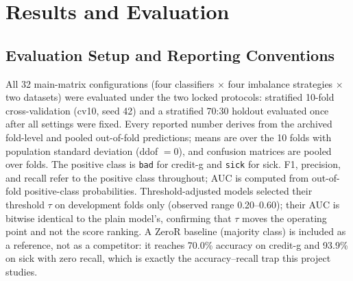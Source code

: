 
\section{Results and Evaluation}
\label{sec:results}
%
%

\subsection{Evaluation Setup and Reporting Conventions}
\label{sec:results-setup}

All 32 main-matrix configurations (four classifiers $\times$ four imbalance strategies $\times$ two datasets) were evaluated under the two locked protocols: stratified 10-fold cross-validation (cv10, seed 42) and a stratified 70:30 holdout evaluated once after all settings were fixed. Every reported number derives from the archived fold-level and pooled out-of-fold predictions; means are over the 10 folds with population standard deviation (ddof $=0$), and confusion matrices are pooled over folds. The positive class is \texttt{bad} for credit-g and \texttt{sick} for sick. F1, precision, and recall refer to the positive class throughout; AUC is computed from out-of-fold positive-class probabilities. Threshold-adjusted models selected their threshold $\tau$ on development folds only (observed range 0.20--0.60); their AUC is bitwise identical to the plain model's, confirming that $\tau$ moves the operating point and not the score ranking. A ZeroR baseline (majority class) is included as a reference, not as a competitor: it reaches 70.0\% accuracy on credit-g and 93.9\% on sick with zero recall, which is exactly the accuracy--recall trap this project studies.

